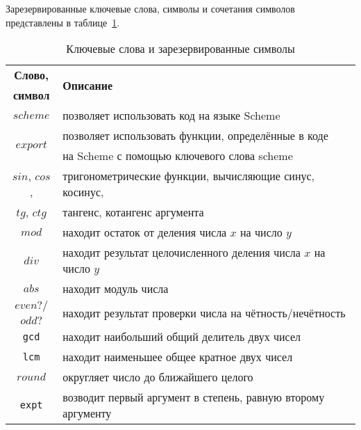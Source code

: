 \begin{itemize}
            Зарезервированные ключевые слова, символы и сочетания символов представлены в таблице~\ref{tabular:kw}.
            \clearpage
            \begin{table}[ht!]
                \caption{Ключевые слова и зарезервированные символы\bigskip}
                \centering
                \label{tabular:kw}
                \begin{tabular}{|c|l|}
                    \hline
                    \bf{Слово,}                 & \multirow{2}{*}{\bf{Описание}} \\
                    \bf{символ}                 & \\ \hline
                    $scheme$                    & позволяет использовать код на языке Scheme \\ \hline
                    \multirow{2}{*}{$export$ }  & позволяет использовать функции, определённые в коде \\
                                                & на Scheme с помощью ключевого слова scheme \\ \hline
                    $sin$, $cos$,               & тригонометрические функции, вычисляющие синус, косинус, \\
                    $tg$, $ctg$                 & тангенс, котангенс аргумента \\ \hline
                    $mod$                       & находит остаток от деления числа $x$ на число $y$ \\ \hline
                    $div$                       & находит результат целочисленного деления числа $x$ на число $y$ \\ \hline
                    $abs$                       & находит модуль числа \\ \hline
                    $even?/$                    & \multirow{2}{*}{находит результат проверки числа на чётность/нечётность} \\
                    $odd?$                      & \\ \hline
                    \verb!gcd!                  & находит наибольший общий делитель двух чисел \\ \hline
                    \verb!lcm!                  & находит наименьшее общее кратное двух чисел \\ \hline
                    $round$                     & округляет число до ближайшего целого\\ \hline
                    \verb!expt!                 & возводит первый аргумент в степень, равную второму аргументу \\ \hline

\end{tabular}
\end{table}
\end{itemize}
